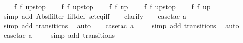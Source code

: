 \begin{isabellebody}
\ \ \ \ {\isacharparenleft}{\isacharparenleft}f{}{\isacharcomma}\ f{}{\isacharparenright}{\isacharcomma}\ up{}{}stop{\isacharparenright}{\isacharcomma}\isanewline
\ \ \ \ {\isacharparenleft}{\isacharparenleft}f{}{\isacharcomma}\ f{}{\isacharparenright}{\isacharcomma}\ up{}{}stop{\isacharparenright}{\isacharcomma}\isanewline
\ \ \ \ {\isacharparenleft}{\isacharparenleft}f{}{\isacharcomma}\ f{}{\isacharparenright}{\isacharcomma}\ up{}{}{\isacharparenright}{\isacharcomma}\isanewline
\ \ \ \ {\isacharparenleft}{\isacharparenleft}f{}{\isacharcomma}\ f{}{\isacharparenright}{\isacharcomma}\ up{}{}stop{\isacharparenright}{\isacharcomma}\isanewline
\ \ \ \ {\isacharparenleft}{\isacharparenleft}f{}{\isacharcomma}\ f{}{\isacharparenright}{\isacharcomma}\ up{}{}{\isacharparenright}\isanewline
{\isacharbar}{\isacharbraceright}{\isachardoublequoteclose}\isanewline
%
\isadelimproof
\ \ %
\endisadelimproof
%
\isatagproof
{}\isamarkupfalse%
\ {\isacharparenleft}simp\ add{\isacharcolon}\ Abs{\isacharunderscore}ffilter\ lift{\isacharunderscore}def\ set{\isacharunderscore}eq{\isacharunderscore}iff{\isacharparenright}\isanewline
\ \ \isamarkupfalse%
\ clarify\isanewline
\ \ \isamarkupfalse%
\ {\isacharparenleft}case{\isacharunderscore}tac\ {\isachardoublequoteopen}a{\isacharequal}{}{\isachardoublequoteclose}{\isacharparenright}\isanewline
\ \ \ \isamarkupfalse%
\ {\isacharparenleft}simp\ add{\isacharcolon}\ transitions{\isacharparenright}\ \isamarkupfalse%
\ auto{\isacharbrackleft}{}{\isacharbrackright}\isanewline
\ \ \isamarkupfalse%
\ {\isacharparenleft}case{\isacharunderscore}tac\ {\isachardoublequoteopen}a{\isacharequal}{}{\isachardoublequoteclose}{\isacharparenright}\isanewline
\ \ \ \isamarkupfalse%
\ {\isacharparenleft}simp\ add{\isacharcolon}\ transitions{\isacharparenright}\ \isamarkupfalse%
\ auto{\isacharbrackleft}{}{\isacharbrackright}\isanewline
\ \ \isamarkupfalse%
\ {\isacharparenleft}case{\isacharunderscore}tac\ {\isachardoublequoteopen}a{\isacharequal}{}{\isachardoublequoteclose}{\isacharparenright}\isanewline
\ \ \ \isamarkupfalse%
\ {\isacharparenleft}simp\ add{\isacharcolon}\ transitions{\isacharparenright}\ \isamarkupfalse%

\end{isabellebody}
